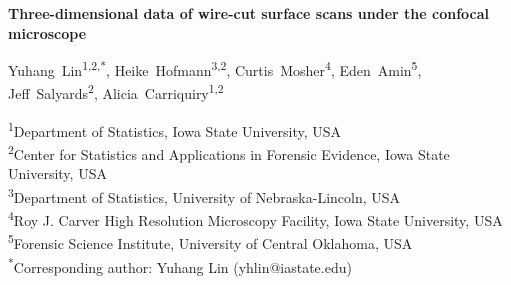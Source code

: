 \documentclass[11pt,a4paper]{article}
\begin{document}
\linenumbers

\begin{center}
{\LARGE\bfseries Three-dimensional data of wire-cut surface scans under
the confocal
microscope\begingroup\renewcommand{\thefootnote}{\fnsymbol{footnote}}\footnotemark[2]\endgroup\par}
\vspace{1em}
{\large
\mbox{Yuhang Lin\textsuperscript{1,2,*}}, %
\mbox{Heike Hofmann\textsuperscript{3,2}}, %
\mbox{Curtis Mosher\textsuperscript{4}}, %
\mbox{Eden Amin\textsuperscript{5}}, %
\mbox{Jeff Salyards\textsuperscript{2}}, %
\mbox{Alicia Carriquiry\textsuperscript{1,2}}\par}
\vspace{0.75em}
{\small
\textsuperscript{1}Department of Statistics, Iowa State
University, USA\\
\textsuperscript{2}Center for Statistics and Applications in Forensic
Evidence, Iowa State University, USA\\
\textsuperscript{3}Department of Statistics, University of
Nebraska-Lincoln, USA\\
\textsuperscript{4}Roy J. Carver High Resolution Microscopy
Facility, Iowa State University, USA\\
\textsuperscript{5}Forensic Science Institute, University of Central
Oklahoma, USA\\\textsuperscript{*}Corresponding author: Yuhang
Lin (yhlin@iastate.edu)
\par}
\end{center}
\begingroup
\renewcommand{\thefootnote}{\fnsymbol{footnote}}
\endgroup
\vspace{1em}

\begin{abstract}
Wire-cut striation marks provide evidence for forensic source
identification, but publicly available datasets and reproducible
quantitative workflows for analyzing these marks are limited. We present
a dataset of 134 three-dimensional topographic scans in \texttt{x3p}
format from aluminum wires cut with five KWS-105 wire cutters. The main
experiment contains 120 scans: two replicates at each of three cutting
locations for each of the 20 tool-edge combinations. Fourteen additional
scans assess staging and acquisition variability for a randomly selected
tool and location. We provide additional scan metadata, manually
extracted profiles, processed signals, cross-correlation function (CCF)
values for pairwise aligned signals, images, and analysis code. The
accompanying workflow covers scan inspection, profile and signal
extraction, alignment, pairwise similarity visualization, CCF
distributions for same-source and different-source comparisons, and
variability assessment across replicates, stagings, and acquisitions.
The dataset and workflow support the development, evaluation, and
reproducible comparison of quantitative methods for wire-cut evidence.
\end{abstract}
\end{document}
